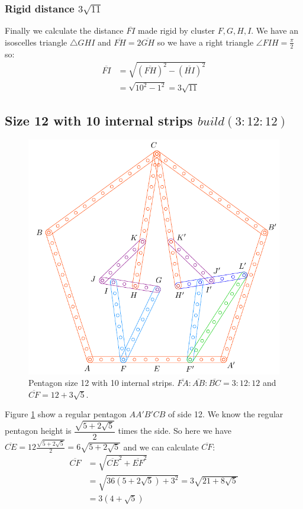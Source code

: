 \documentclass[11pt]{article}
\begin{document}
\subsubsection{Rigid distance $3\sqrt{11}$}

Finally we calculate the distance $\overline{FI}$ made rigid by cluster $F,G,H,I$. We have an isoscelles triangle $\triangle{GHI}$ and $\overline{FH}=2\overline{GH}$ so we have a right triangle $\angle{FIH}=\frac{\pi}2$ so: \begin{align}
\overline{FI} &= \sqrt{(\overline{FH})^2 - (\overline{HI})^2}\nonumber\\
 &= \sqrt{10^2 - 1^2} = 3\sqrt{11}
\end{align}

\subsection{Size 12 with 10 internal strips $build(3:12:12)$}

\begin{figure}[H]
 \centering
 \includegraphics[scale=0.80]{12/penta12-10a}
 \caption{Pentagon size 12 with 10 internal strips.  $\overline{FA}:\overline{AB}:\overline{BC} = 3:12:12$ and $\overline{CF} = 12 + 3\sqrt5$.}
 \label{fig:penta12-10a}
\end{figure}

Figure \ref{fig:penta12-10a} show a regular pentagon $AA'B'CB$ of side 12. We know the regular pentagon height is $\dfrac{\sqrt{5+2\sqrt5}}2$ times the side. So here we have $\overline{CE} = 12\frac{\sqrt{5+2\sqrt5}}2 = 6\sqrt{5+2\sqrt5}$ and we can calculate $\overline{CF}$:
\begin{align}
\overline{CF} &= \sqrt{\overline{CE}^2 + \overline{EF}^2}\nonumber\\
 &= \sqrt{36(5+2\sqrt5) + 3^2} = 3\sqrt{21+8\sqrt5} \nonumber\\
 &= 3(4 + \sqrt5)
\end{align}
\end{document}
